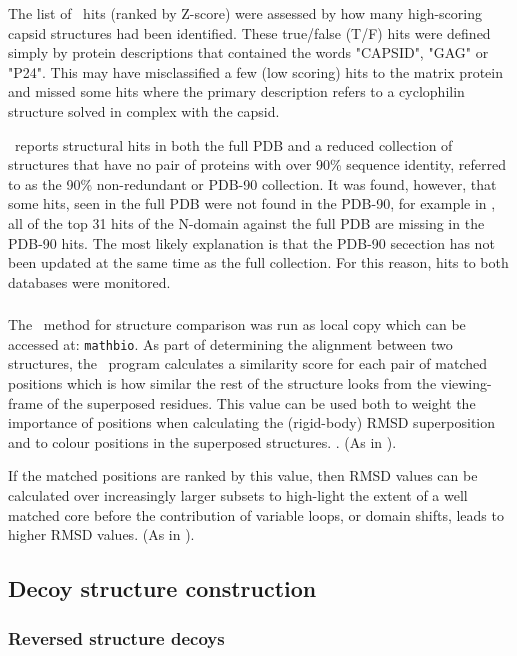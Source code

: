 The list of \DALI\ hits (ranked by Z-score) were assessed by how many high-scoring capsid structures had
been identified.    These true/false (T/F) hits were defined simply by protein descriptions that contained the
words "CAPSID", "GAG" or "P24".   This may have misclassified a few (low scoring) hits to the matrix protein
and missed some hits where the primary description refers to a cyclophilin structure solved in complex 
with the capsid. 

\DALI\ reports structural hits in both the full PDB and a reduced collection of structures that
have no pair of proteins with over 90\% sequence identity, referred to as the 90\% non-redundant or PDB-90 collection.
It was found, however, that some hits, seen in the full PDB were not found in the PDB-90, for example in ,
all of the top 31 hits of the N-domain against the full PDB are missing in the PDB-90 hits.
The most likely explanation is that the PDB-90 secection has not been updated at the same time
as the full collection.    For this reason, hits to both databases were monitored.

\subsubsection{\SAP}

The \SAP\ method for structure comparison \cite{TaylorWR99a} was run as local copy which can
be accessed at: {\tt mathbio}.   As part of determining the alignment between two structures,
the \SAP\ program calculates a similarity score for each pair of matched positions which is
how similar the rest of the structure looks from the viewing-frame of the superposed residues.
This value can be used both to weight the importance of positions when calculating the
(rigid-body) RMSD superposition and to colour positions in the superposed structures.
\cite{RippmannFet91a}. (As in ).

If the matched positions are ranked by this value, then RMSD values can be calculated over
increasingly larger subsets to high-light the extent of a well matched core before
the contribution of variable loops, or domain shifts, leads to higher RMSD values.
(As in ).

\subsection{Decoy structure construction}

\subsubsection{Reversed structure decoys}

